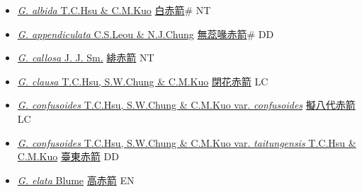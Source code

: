 \begin{itemize}
  \begin{itemize}
        \item[] \href{http://www.theplantlist.org/tpl1.1/search?q=Gastrodia+albida}{\textit{G. albida} T.C.Hsu \& C.M.Kuo}   \href{\detokenize{http://taibnet.sinica.edu.tw/chi/taibnet_species_list.php?T2=白赤箭&T2_new_value=true&fr=y}}{白赤箭}\# NT
        \item[] \href{http://www.theplantlist.org/tpl1.1/search?q=Gastrodia+appendiculata}{\textit{G. appendiculata} C.S.Leou \& N.J.Chung}   \href{\detokenize{http://taibnet.sinica.edu.tw/chi/taibnet_species_list.php?T2=無蕊喙赤箭&T2_new_value=true&fr=y}}{無蕊喙赤箭}\# DD
        \item[] \href{http://www.theplantlist.org/tpl1.1/search?q=Gastrodia+callosa}{\textit{G. callosa} J. J. Sm.}   \href{\detokenize{http://taibnet.sinica.edu.tw/chi/taibnet_species_list.php?T2=緋赤箭&T2_new_value=true&fr=y}}{緋赤箭} NT
        \item[] \href{http://www.theplantlist.org/tpl1.1/search?q=Gastrodia+clausa}{\textit{G. clausa} T.C.Hsu, S.W.Chung \& C.M.Kuo}   \href{\detokenize{http://taibnet.sinica.edu.tw/chi/taibnet_species_list.php?T2=閉花赤箭&T2_new_value=true&fr=y}}{閉花赤箭} LC
        \item[] \href{http://www.theplantlist.org/tpl1.1/search?q=Gastrodia+confusoides+var.+confusoides}{\textit{G. confusoides} T.C.Hsu, S.W.Chung \& C.M.Kuo var. \textit{confusoides}}   \href{\detokenize{http://taibnet.sinica.edu.tw/chi/taibnet_species_list.php?T2=擬八代赤箭&T2_new_value=true&fr=y}}{擬八代赤箭} LC
        \item[] \href{http://www.theplantlist.org/tpl1.1/search?q=Gastrodia+confusoides+var.+taitungensis}{\textit{G. confusoides} T.C.Hsu, S.W.Chung \& C.M.Kuo var. \textit{taitungensis} T.C.Hsu \& C.M.Kuo}   \href{\detokenize{http://taibnet.sinica.edu.tw/chi/taibnet_species_list.php?T2=臺東赤箭&T2_new_value=true&fr=y}}{臺東赤箭} DD
        \item[] \href{http://www.theplantlist.org/tpl1.1/search?q=Gastrodia+elata}{\textit{G. elata} Blume}   \href{\detokenize{http://taibnet.sinica.edu.tw/chi/taibnet_species_list.php?T2=高赤箭&T2_new_value=true&fr=y}}{高赤箭} EN

\end{itemize}
\end{itemize}
